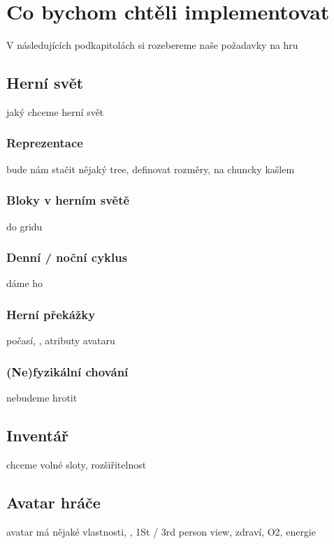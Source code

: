 


\section{Co bychom chtěli implementovat}

V následujících podkapitolách si rozebereme naše požadavky na hru








\subsection{Herní svět}

jaký chceme herní svět

\subsubsection{Reprezentace}

bude nám stačit nějaký tree, definovat rozměry, na chuncky kašlem

\subsubsection{Bloky v herním světě}

do gridu

\subsubsection{Denní / noční cyklus}
dáme ho

\subsubsection{Herní překážky}

počasí, , atributy avataru

\subsubsection{(Ne)fyzikální chování}

nebudeme hrotit

\subsection{Inventář}

chceme volné sloty, rozšiřitelnost

\subsection{Avatar hráče}
avatar má nějaké vlastnosti, \HUD{}, 1St / 3rd person view, zdraví,  O2, energie



